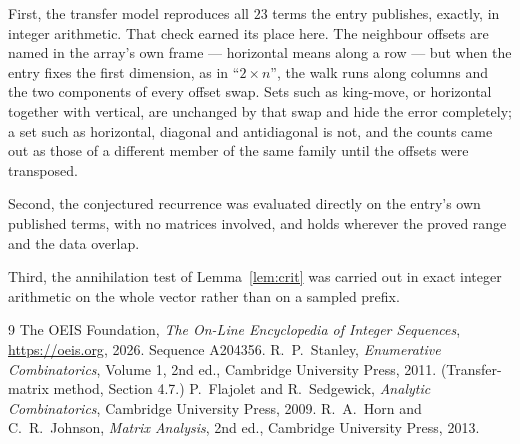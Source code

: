 \documentclass[11pt,a4paper]{article}
\theoremstyle{plain}
\theoremstyle{definition}
\begin{document}
First, the transfer model reproduces all $23$ terms the entry publishes, exactly, in
integer arithmetic. That check earned its place here. The neighbour offsets are named in the
array's own frame --- horizontal means along a row --- but when the entry fixes the first
dimension, as in ``$2\times n$'', the walk runs along columns and the two components of every
offset swap. Sets such as king-move, or horizontal together with vertical, are unchanged by
that swap and hide the error completely; a set such as horizontal, diagonal and antidiagonal
is not, and the counts came out as those of a different member of the same family until the
offsets were transposed.

Second, the conjectured recurrence was evaluated directly on the entry's own published terms,
with no matrices involved, and holds wherever the proved range and the data overlap.

Third, the annihilation test of Lemma~\ref{lem:crit} was carried out in exact integer
arithmetic on the whole vector rather than on a sampled prefix.

\begin{thebibliography}{9}
 The OEIS Foundation, \emph{The On-Line Encyclopedia of Integer
Sequences}, \url{https://oeis.org}, 2026. Sequence A204356.
 R.~P.~Stanley, \emph{Enumerative Combinatorics}, Volume 1, 2nd ed.,
Cambridge University Press, 2011. (Transfer-matrix method, Section 4.7.)
 P.~Flajolet and R.~Sedgewick, \emph{Analytic Combinatorics}, Cambridge
University Press, 2009.
 R.~A.~Horn and C.~R.~Johnson, \emph{Matrix Analysis}, 2nd ed., Cambridge
University Press, 2013.
\end{thebibliography}
\end{document}
